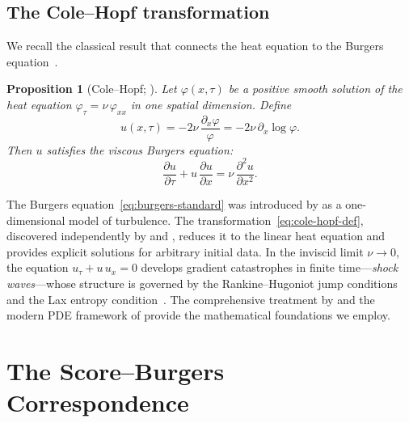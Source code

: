 \documentclass[11pt]{article}
\newtheorem{proposition}[theorem]{Proposition}
\begin{document}
\subsection{The Cole--Hopf transformation}\label{sec:prelim:cole-hopf}

We recall the classical result that connects the heat equation to the Burgers equation~\citep{hopf1950partial, cole1951quasi}.

\begin{proposition}[Cole--Hopf; \citealp{hopf1950partial,cole1951quasi}]\label{prop:cole-hopf}
Let $\varphi(x,\tau)$ be a positive smooth solution of the heat equation $\varphi_\tau = \nu\,\varphi_{xx}$ in one spatial dimension.
Define
\begin{equation}\label{eq:cole-hopf-def}
  u(x,\tau) = -2\nu\,\frac{\partial_x \varphi}{\varphi} = -2\nu\,\partial_x \log \varphi.
\end{equation}
Then $u$ satisfies the viscous Burgers equation:
\begin{equation}\label{eq:burgers-standard}
  \frac{\partial u}{\partial \tau} + u\,\frac{\partial u}{\partial x} = \nu\,\frac{\partial^2 u}{\partial x^2}.
\end{equation}
\end{proposition}

The Burgers equation~\eqref{eq:burgers-standard} was introduced by \citet{burgers1948mathematical} as a one-dimensional model of turbulence.
The transformation~\eqref{eq:cole-hopf-def}, discovered independently by \citet{hopf1950partial} and \citet{cole1951quasi}, reduces it to the linear heat equation and provides explicit solutions for arbitrary initial data.
In the inviscid limit $\nu \to 0$, the equation $u_\tau + u\,u_x = 0$ develops gradient catastrophes in finite time---\emph{shock waves}---whose structure is governed by the Rankine--Hugoniot jump conditions~\citep{rankine1870thermodynamic, hugoniot1889propagation} and the Lax entropy condition~\citep{lax1957hyperbolic}.
The comprehensive treatment by \citet{whitham1974linear} and the modern PDE framework of \citet{evans2010partial} provide the mathematical foundations we employ.


\section{The Score--Burgers Correspondence}\label{sec:score-burgers}
\end{document}
